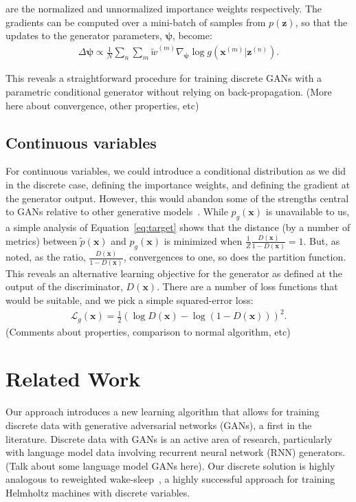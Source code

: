 \documentclass[10pt]{article}
\newcommand{\vect}[1]{\mathbf{#1}}
\newcommand{\vects}[1]{\boldsymbol{#1}}
\newcommand{\vx}[0]{\vect{x}}
\newcommand{\vz}[0]{\vect{z}}
\newcommand{\PS}[0]{\vects{\psi}}
\begin{document}
are the normalized and unnormalized importance weights respectively.
The gradients can be computed over a mini-batch of samples from $p(\vz)$, so that the updates to the generator parameters, $\PS$, become:
\begin{align}
\Delta \PS \propto \frac{1}{N} \sum_n \sum_m \tilde{w}^{(m)} \nabla_{\PS} \log g(\vx^{(m)} | \vz^{(n)}).
\end{align}

This reveals a straightforward procedure for training discrete GANs with a parametric conditional generator without relying on back-propagation.
(More here about convergence, other properties, etc)

\subsection{Continuous variables}
For continuous variables, we could introduce a conditional distribution as we did in the discrete case, defining the importance weights, and defining the gradient at the generator output.
However, this would abandon some of the strengths central to GANs relative to other generative models~\citep{goodfellow2016nips}.
While $p_g(\vx)$ is unavailable to us, a simple analysis of Equation~\ref{eq:target} shows that the distance (by a number of metrics) between $\tilde{p}(\vx)$ and $p_g(\vx)$ is minimized when $\frac{1}{Z} \frac{D(\vx)}{1 - D(\vx)} = 1$.
But, as noted, as the ratio, $\frac{D(\vx)}{1 - D(\vx)}$, convergences to one, so does the partition function.
This reveals an alternative learning objective for the generator as defined at the output of the discriminator, $D(\vx)$.
There are a number of loss functions that would be suitable, and we pick a simple squared-error loss:
\begin{align}
\mathcal{L}_g(\vx) = \frac{1}{2}\left( \log D(\vx) - \log (1 - D(\vx)) \right) ^ 2.
\end{align}
(Comments about properties, comparison to normal algorithm, etc)

\section{Related Work}
Our approach introduces a new learning algorithm that allows for training discrete data with generative adversarial networks (GANs), a first in the literature.
Discrete data with GANs is an active area of research, particularly with language model data involving recurrent neural network (RNN) generators.
(Talk about some language model GANs here).
Our discrete solution is highly analogous to reweighted wake-sleep~\citep[RWS,][]{bornschein2014reweighted}, a highly successful approach for training Helmholtz machines with discrete variables.
\end{document}
